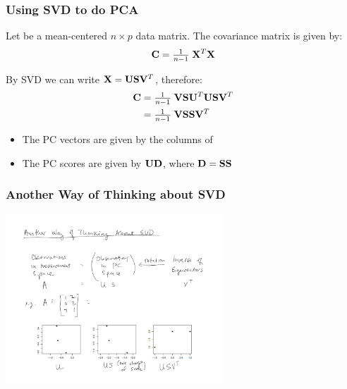 \documentclass{beamer}
\begin{document}
\begin{frame}[fragile]
  \frametitle{Using SVD to do PCA}

Let  be a mean-centered $n \times p$ data matrix. The covariance matrix is given by:
\begin{align*}
  \mathbf{C} = \tfrac{1}{n-1} \; \mathbf{X}^T \mathbf{X}
\end{align*}

By SVD we can write $\mathbf{X} = \mathbf{U}\mathbf{S}\mathbf{V}^T$, therefore:
\begin{align*}
  \mathbf{C} &= \tfrac{1}{n-1} \; \mathbf{V}\mathbf{S}\mathbf{U}^T \mathbf{U}\mathbf{S}\mathbf{V}^T \\
          &= \tfrac{1}{n-1} \; \mathbf{V} \mathbf{S}\mathbf{S} \mathbf{V}^T
\end{align*}

\begin{itemize}
  \item The PC vectors are given by the columns of 
  \item The PC scores are given by $\mathbf{U}\mathbf{D}$, where $\mathbf{D} = \mathbf{S}\mathbf{S}$
\end{itemize}

\end{frame}




\begin{frame}
  \frametitle{Another Way of Thinking about SVD}


\begin{center}
\includegraphics[height=2.5in]{svd-another-view}
\end{center}

\end{frame}

\end{document}

